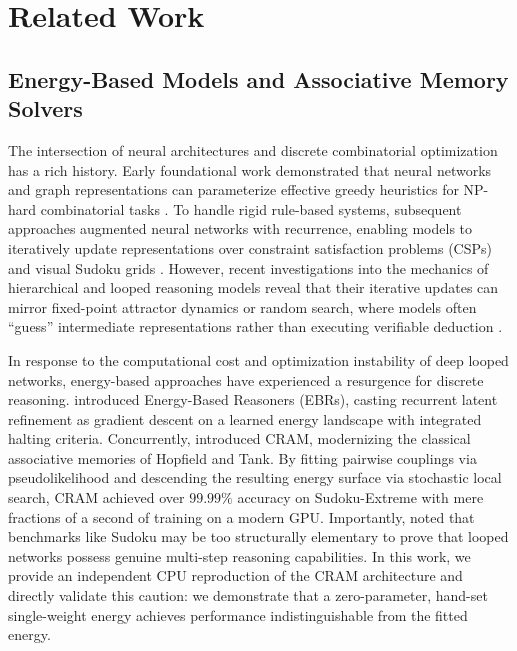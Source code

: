 \documentclass{article} %
\begin{document}
\section{Related Work}
\label{sec:related_work}
\subsection{Energy-Based Models and Associative Memory Solvers}
The intersection of neural architectures and discrete combinatorial optimization has a rich history. Early foundational work demonstrated that neural networks and graph representations can parameterize effective greedy heuristics for NP-hard combinatorial tasks \citep{Dai2017LearningCombinatorial}. To handle rigid rule-based systems, subsequent approaches augmented neural networks with recurrence, enabling models to iteratively update representations over constraint satisfaction problems (CSPs) and visual Sudoku grids \citep{Yang2023LearningSolve}. However, recent investigations into the mechanics of hierarchical and looped reasoning models reveal that their iterative updates can mirror fixed-point attractor dynamics or random search, where models often ``guess'' intermediate representations rather than executing verifiable deduction \citep{Ren2026YourReasoning}.

In response to the computational cost and optimization instability of deep looped networks, energy-based approaches have experienced a resurgence for discrete reasoning. \citet{Chen2026EnergybasedReasoners} introduced Energy-Based Reasoners (EBRs), casting recurrent latent refinement as gradient descent on a learned energy landscape with integrated halting criteria. Concurrently, \citet{Hoover2026ClassicalEnergies} introduced CRAM, modernizing the classical associative memories of Hopfield and Tank. By fitting pairwise couplings via pseudolikelihood and descending the resulting energy surface via stochastic local search, CRAM achieved over $99.99\%$ accuracy on Sudoku-Extreme with mere fractions of a second of training on a modern GPU. Importantly, \citet{Hoover2026ClassicalEnergies} noted that benchmarks like Sudoku may be too structurally elementary to prove that looped networks possess genuine multi-step reasoning capabilities. In this work, we provide an independent CPU reproduction of the CRAM architecture and directly validate this caution: we demonstrate that a zero-parameter, hand-set single-weight energy achieves performance indistinguishable from the fitted energy.
\end{document}
